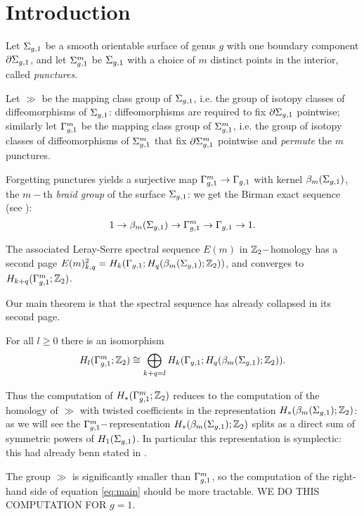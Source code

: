 \section{Introduction}
Let $\Sigma_{g,1}$ be a smooth orientable surface of genus $g$ with one boundary component $\partial\Sigma_{g,1}$, and let $\Sigma_{g,1}^m$ be $\Sigma_{g,1}$ with
a choice of $m$ distinct points in the interior, called \emph{punctures}.

Let $\gg$ be the mapping class group of $\Sigma_{g,1}$, i.e. the group of isotopy classes of diffeomorphisms of $\Sigma_{g,1}$:
diffeomorphisms are required to fix $\partial\Sigma_{g,1}$ pointwise; similarly let $\Gamma_{g,1}^m$ be the mapping class group of $\Sigma_{g,1}^m$, i.e.
the group of isotopy classes of diffeomorphisms of $\Sigma_{g,1}^m$ that fix $\partial\Sigma_{g,1}^m$ pointwise and \emph{permute} the $m$ punctures.

Forgetting punctures yields a surjective map $\Gamma_{g,1}^m\to\Gamma_{g,1}$ with kernel $\beta_{m}(\Sigma_{g,1})$,
the $m-$th \emph{braid group} of the surface $\Sigma_{g,1}$: we get the Birman exact sequence (see \cite{Birman:mcgbr}):
\begin{equation}
\label{eq:Birman}
1\to\beta_{m}(\Sigma_{g,1})\to\Gamma_{g,1}^m\to\Gamma_{g,1}\to 1.
\end{equation}

The associated Leray-Serre spectral sequence $E(m)$ in $\mathbb{Z}_2-$homology has a second page $E(m)^2_{k,q}=H_k(\Gamma_{g,1};H_q(\beta_{m}(\Sigma_{g,1});\mathbb{Z}_2))$,
and converges to $H_{k+q}(\Gamma_{g,1}^m;\mathbb{Z}_2)$.

Our main theorem is that the spectral sequence has already collapsed in its second page.
\begin{thm}
\label{thm:main}
For all $l\geq 0$ there is an isomorphism
\begin{equation}
\label{eq:main}
 H_l(\Gamma_{g,1}^m;\mathbb{Z}_2)\cong \bigoplus_{k+q=l} H_k(\Gamma_{g,1};H_q(\beta_{m}(\Sigma_{g,1});\mathbb{Z}_2)).
\end{equation}
\end{thm}
Thus the computation of $H_*(\Gamma_{g,1}^m;\mathbb{Z}_2)$ reduces to the computation of the homology of $\gg$ with
twisted coefficients in the representation $H_*(\beta_{m}(\Sigma_{g,1});\mathbb{Z}_2)$: as we will see the $\Gamma_{g,1}^m-$representation
$H_*(\beta_{m}(\Sigma_{g,1});\mathbb{Z}_2)$ splits as a direct sum of symmetric powers of $H_1(\Sigma_{g,1})$.
In particular this representation is symplectic: this had already benn stated in \cite{LM}.

The group $\gg$ is significantly smaller than $\Gamma_{g,1}^m$, so the
computation of the right-hand side of equation \ref{eq:main}
should be more tractable.
WE DO THIS COMPUTATION FOR $g=1$.

